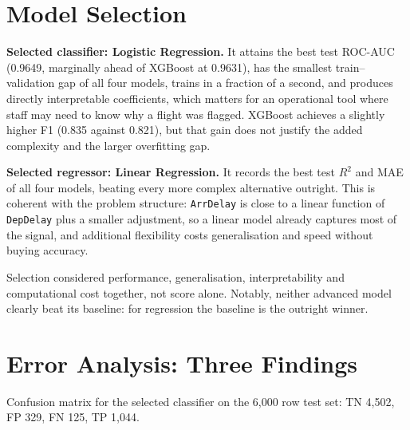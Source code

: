 \documentclass[11pt,a4paper]{article}
\begin{document}
\section{Model Selection}

\textbf{Selected classifier: Logistic Regression.} It attains the best test ROC-AUC
(0.9649, marginally ahead of XGBoost at 0.9631), has the smallest train--validation gap
of all four models, trains in a fraction of a second, and produces directly interpretable
coefficients, which matters for an operational tool where staff may need to know why a
flight was flagged. XGBoost achieves a slightly higher F1 (0.835 against 0.821), but
that gain does not justify the added complexity and the larger overfitting gap.

\textbf{Selected regressor: Linear Regression.} It records the best test $R^2$ and MAE
of all four models, beating every more complex alternative outright. This is coherent
with the problem structure: \texttt{ArrDelay} is close to a linear function of
\texttt{DepDelay} plus a smaller adjustment, so a linear model already captures most of
the signal, and additional flexibility costs generalisation and speed without buying
accuracy.

Selection considered performance, generalisation, interpretability and computational
cost together, not score alone. Notably, neither advanced model clearly beat its
baseline: for regression the baseline is the outright winner.

\section{Error Analysis: Three Findings}

Confusion matrix for the selected classifier on the 6,000 row test set:
TN 4{,}502, FP 329, FN 125, TP 1{,}044.
\end{document}
